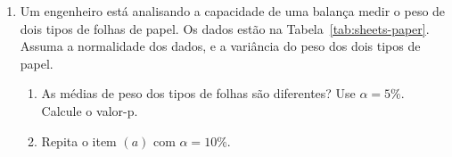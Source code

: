 \documentclass[8pt, a4paper]{article}
\begin{document}
\begin{enumerate}
	\item Um engenheiro está analisando a capacidade de uma balança medir o peso de dois tipos de folhas de papel. Os dados estão na Tabela~\ref{tab:sheets-paper}. Assuma a normalidade dos dados, e a variância do peso dos dois tipos de papel.
	\begin{table}[ht]
		\centering
		\caption{Peso de folhas de papel em gramas.} 
		\label{tab:sheets-paper}
	\end{table}
	\begin{enumerate}
		\item As médias de peso dos tipos de folhas são diferentes? Use $\alpha = 5\%$. Calcule o valor-p.
		\item Repita o item $(a)$ com $\alpha = 10\%$.
	\end{enumerate}
	

\end{enumerate}
\end{document}
